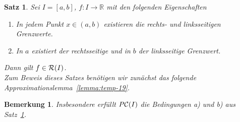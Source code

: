 \documentclass[11pt, twoside, a4paper]{article}
\theoremstyle{plain}
\newtheorem{bemerkung}[blockelement]{Bemerkung}
\newtheorem{satz}[blockelement]{Satz}
\numberwithin{equation}{subsection}
\newcommand{\pair}[1]{\left(#1\right)}
\newcommand{\of}[1]{\mathopen{}\mathclose{}\bgroup\left(#1\aftergroup\egroup\right)}
\newcommand{\interv}[1]{\left[#1\right]}
\newcommand{\fromto}{\rightarrow{}}
\newcommand{\R}{\mathbb{R}}
\newcommand{\mR}{\mathcal{R}}
\newcommand{\mC}{\mathcal{C}}
\begin{document}
    \begin{satz} %
        \label{satz:temp-18}
        \marginnote{[26. Apr]}
        Sei $I=\interv{a,b}$, $f: I\fromto\R$ mit den folgenden Eigenschaften
        \begin{enumerate}[label=(\alph*)]
            \item In jedem Punkt $x\in\pair{a,b}$ existieren die rechts- und linksseitigen Grenzwerte.
            \item In $a$ existiert der rechtsseitige und in $b$ der linksseitige Grenzwert.
        \end{enumerate}
        Dann gilt $f\in \mR\of{I}$.\\
        Zum Beweis dieses Satzes benötigen wir zunächst das folgende Approximationslemma~\ref{lemma:temp-19}.
    \end{satz}

    \begin{bemerkung}
        Insbesondere erfüllt $P\mC\of{I}$ die Bedingungen a) und b) aus Satz~\ref{satz:temp-18}.
    \end{bemerkung}
\end{document}
